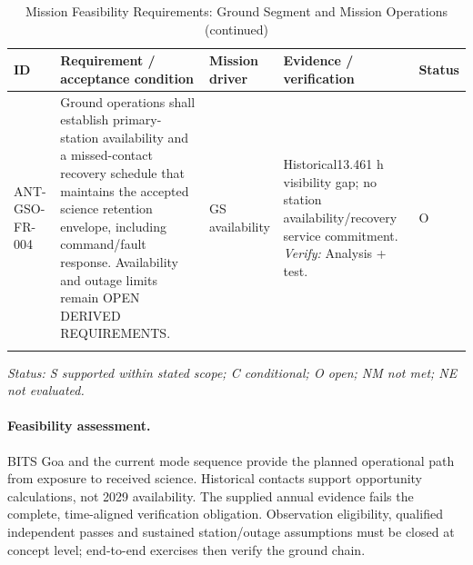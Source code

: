 \begin{table}[H]\centering\small\setlength{\tabcolsep}{3pt}
\ContinuedFloat\captionsetup{list=no}
\caption{Mission Feasibility Requirements: Ground Segment and Mission Operations (continued)}
\begin{tabular}{@{}
>{\RaggedRight\arraybackslash}p{}
>{\RaggedRight\arraybackslash}p{}
>{\RaggedRight\arraybackslash}p{}
>{\RaggedRight\arraybackslash}p{}
>{\RaggedRight\arraybackslash}p{}
@{}}
\toprule ID & Requirement / acceptance condition & Mission driver & Evidence / verification & Status\\\midrule
{}\label{req:ANT-GSO-FR-004}\mbox{ANT-GSO-}\newline\mbox{FR-004} & Ground operations shall establish primary-station availability and a missed-contact recovery schedule that maintains the accepted science retention envelope, including command/fault response. Availability and outage limits remain OPEN DERIVED REQUIREMENTS. & GS availability & Historical13.461 h visibility gap; no station availability/recovery service commitment. \emph{Verify:} Analysis + test. & O\\
\addlinespace[3pt]
\bottomrule
\end{tabular}
\end{table}
\textit{Status: S supported within stated scope; C conditional; O open; NM not met; NE not evaluated.}
\paragraph{Feasibility assessment.} BITS Goa and the current mode sequence provide the planned operational path from exposure to received science. Historical contacts support opportunity calculations, not 2029 availability. The supplied annual evidence fails the complete, time-aligned verification obligation. Observation eligibility, qualified independent passes and sustained station/outage assumptions must be closed at concept level; end-to-end exercises then verify the ground chain.
